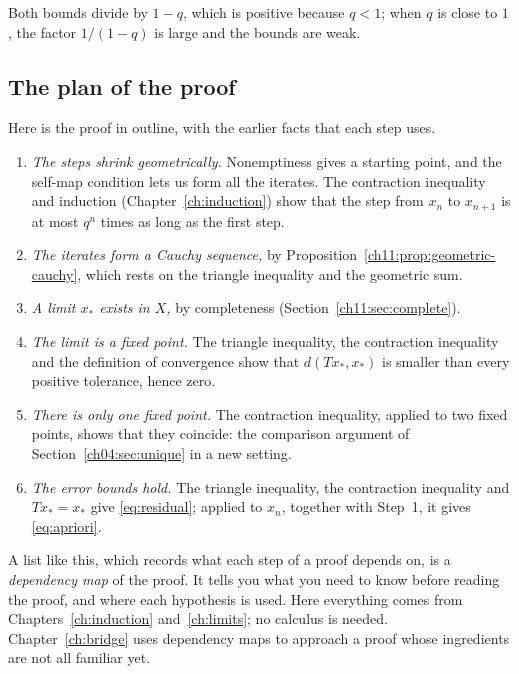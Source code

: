 Both bounds divide by $1-q$, which is positive because $q<1$; when $q$ is close to $1$, the factor $1/(1-q)$ is large and the bounds are weak.

\subsection*{The plan of the proof}
Here is the proof in outline, with the earlier facts that each step uses.
\begin{enumerate}
\item \emph{The steps shrink geometrically.} Nonemptiness gives a starting point, and the self-map condition lets us form all the iterates. The contraction inequality and induction (Chapter~\ref{ch:induction}) show that the step from $x_n$ to $x_{n+1}$ is at most $q^n$ times as long as the first step.
\item \emph{The iterates form a Cauchy sequence,} by Proposition~\ref{ch11:prop:geometric-cauchy}, which rests on the triangle inequality and the geometric sum.
\item \emph{A limit $x_*$ exists in $X$,} by completeness (Section~\ref{ch11:sec:complete}).
\item \emph{The limit is a fixed point.} The triangle inequality, the contraction inequality and the definition of convergence show that $d(Tx_*,x_*)$ is smaller than every positive tolerance, hence zero.
\item \emph{There is only one fixed point.} The contraction inequality, applied to two fixed points, shows that they coincide: the comparison argument of Section~\ref{ch04:sec:unique} in a new setting.
\item \emph{The error bounds hold.} The triangle inequality, the contraction inequality and $Tx_*=x_*$ give \eqref{eq:residual}; applied to $x_n$, together with Step~1, it gives \eqref{eq:apriori}.
\end{enumerate}
A list like this, which records what each step of a proof depends on, is a \emph{dependency map} of the proof. It tells you what you need to know before reading the proof, and where each hypothesis is used. Here everything comes from Chapters~\ref{ch:induction} and~\ref{ch:limits}; no calculus is needed. Chapter~\ref{ch:bridge} uses dependency maps to approach a proof whose ingredients are not all familiar yet.
